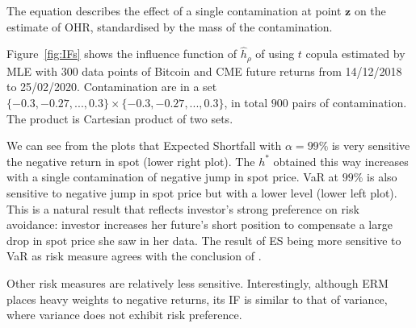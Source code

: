 
The equation describes the effect of a single contamination at point $\bm{z}$ on the estimate of OHR,
standardised by the mass of the contamination. \medskip

Figure~\ref{fig:IFs} shows the influence function of $\hat h_\rho$ of using $t$ copula estimated by MLE with 300 data points of
Bitcoin and CME future returns from 14/12/2018 to 25/02/2020.
Contamination are in a set $\{-0.3,-0.27,..., 0.3\} \times \{-0.3,-0.27,..., 0.3\}$, in total $900$ pairs of contamination.
The product is Cartesian product of two sets.\medskip

We can see from the plots that Expected Shortfall with $\alpha = 99\%$ is very sensitive the negative return in spot (lower right plot).
The $h^*$ obtained this way increases with a single contamination of negative jump in spot price.
VaR at $99\%$ is also sensitive to negative jump in spot price but with a lower level (lower left plot).
This is a natural result that reflects investor's strong preference on risk avoidance: investor increases her future's short position
to compensate a large drop in spot price she saw in her data.
The result of ES being more sensitive to VaR as risk measure agrees with the conclusion of \citet{cont2010robustness}. \medskip

Other risk measures are relatively less sensitive.
Interestingly, although ERM places heavy weights to negative returns,
its IF is similar to that of variance, where variance does not exhibit risk preference.

